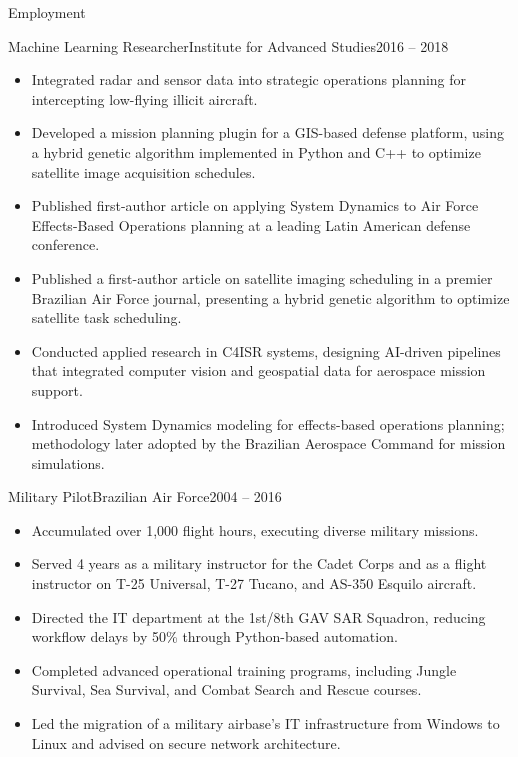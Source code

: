 \documentclass[]{mcdowellcv}
\begin{document}
\begin{cvsection}{Employment}
		\begin{cvsubsection}{Machine Learning Researcher}{Institute for Advanced Studies}{2016 -- 2018}		
			\begin{itemize}
				\item Integrated radar and sensor data into strategic operations planning for intercepting low-flying illicit aircraft.
				\item Developed a mission planning plugin for a GIS-based defense platform, using a hybrid genetic algorithm implemented in Python and C++ to optimize satellite image acquisition schedules.
				\item Published first-author article on applying System Dynamics to Air Force Effects-Based Operations planning at a leading Latin American defense conference.
				\item Published a first-author article on satellite imaging scheduling in a premier Brazilian Air Force journal, presenting a hybrid genetic algorithm to optimize satellite task scheduling.
				\item Conducted applied research in C4ISR systems, designing AI-driven pipelines that integrated computer vision and geospatial data for aerospace mission support.
				\item Introduced System Dynamics modeling for effects-based operations planning; methodology later adopted by the Brazilian Aerospace Command for mission simulations.
			\end{itemize}
		\end{cvsubsection}
		
		\begin{cvsubsection}{Military Pilot}{Brazilian Air Force}{2004 -- 2016}
			\begin{itemize}
				\item Accumulated over 1,000 flight hours, executing diverse military missions.
				\item Served 4 years as a military instructor for the Cadet Corps and as a flight instructor on T-25 Universal, T-27 Tucano, and AS-350 Esquilo aircraft.
				\item Directed the IT department at the 1st/8th GAV SAR Squadron, reducing workflow delays by 50\% through Python-based automation.
				\item Completed advanced operational training programs, including Jungle Survival, Sea Survival, and Combat Search and Rescue courses.
				\item Led the migration of a military airbase’s IT infrastructure from Windows to Linux and advised on secure network architecture.
			\end{itemize}
		\end{cvsubsection}
	\end{cvsection}
	
\end{document}
